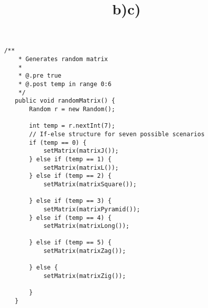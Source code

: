 \documentclass[a4paper,12pt,titlepage]{article}
\theoremstyle{definition}
\theoremstyle{remark}
\begin{document}
\newpage
\title{b)}
\begin{lstlisting}
 /**
     * Generates random matrix
     * 
     * @.pre true
     * @.post temp in range 0:6
     */
    public void randomMatrix() {
        Random r = new Random();

        int temp = r.nextInt(7);
        // If-else structure for seven possible scenarios
        if (temp == 0) {
            setMatrix(matrixJ());
        } else if (temp == 1) {
            setMatrix(matrixL());
        } else if (temp == 2) {
            setMatrix(matrixSquare());

        } else if (temp == 3) {
            setMatrix(matrixPyramid());
        } else if (temp == 4) {
            setMatrix(matrixLong());

        } else if (temp == 5) {
            setMatrix(matrixZag());

        } else {
            setMatrix(matrixZig());

        }
    }    
\end{lstlisting}
\title{c)}
\end{document}
